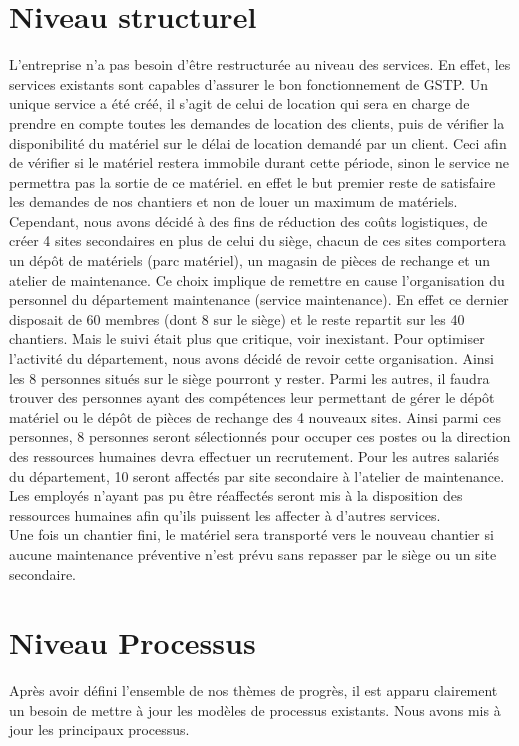         \section{Niveau structurel}
        L'entreprise n'a pas besoin d'être restructurée au niveau des services. En effet, les services existants sont capables d'assurer le bon fonctionnement de GSTP. Un unique service a été créé, il s'agit de celui de location qui sera en charge de prendre en compte toutes les demandes de location des clients, puis de vérifier la disponibilité du matériel sur le délai de location demandé par un client. Ceci afin de vérifier si le matériel restera immobile durant cette période, sinon le service ne permettra pas la sortie de ce matériel. en effet le but premier reste de satisfaire les demandes de nos chantiers et non de louer un maximum de matériels.\\
        
         Cependant, nous avons décidé à des fins de réduction des coûts logistiques, de créer 4 sites secondaires en plus de celui du siège, chacun de ces sites comportera un dépôt de matériels (parc matériel), un magasin de pièces de rechange et un atelier de maintenance. Ce choix implique de remettre en cause l'organisation du personnel du département maintenance (service maintenance). En effet ce dernier disposait de 60 membres (dont 8 sur le siège) et le reste repartit sur les 40 chantiers. Mais le suivi était plus que critique, voir inexistant. Pour optimiser l'activité du département, nous avons décidé de revoir cette organisation. Ainsi les 8 personnes situés sur le siège pourront y rester. Parmi les autres, il faudra trouver des personnes ayant des compétences leur permettant de gérer le dépôt matériel ou le dépôt de pièces de rechange des 4 nouveaux sites. Ainsi parmi ces personnes, 8 personnes seront sélectionnés pour occuper ces postes ou la direction des ressources humaines devra effectuer un recrutement. Pour les autres salariés du département,
10 seront affectés par site secondaire à l'atelier de maintenance. Les employés n'ayant pas pu être réaffectés seront mis à la disposition des ressources humaines afin qu'ils puissent les affecter à d'autres services.\\

Une fois un chantier fini, le matériel sera transporté vers le nouveau chantier si aucune maintenance préventive n'est prévu sans repasser par le siège ou un site secondaire.

        \section{Niveau Processus}
        Après avoir défini l'ensemble de nos thèmes de progrès, il est apparu clairement un besoin de mettre à jour les modèles de processus existants. Nous avons mis à jour les principaux processus.\\


